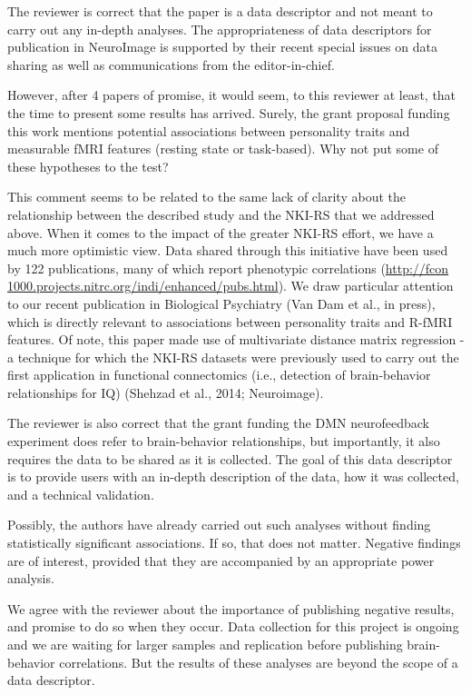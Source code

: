 \documentclass{article}
\newcommand{\RESPONSE}[1]{\textcolor{responseblue}{#1}}
\begin{document}
\RESPONSE{The reviewer is correct that the paper is a data descriptor and not meant to carry out any in-depth analyses. The appropriateness of data descriptors for publication in NeuroImage is supported by their recent special issues on data sharing as well as communications from the editor-in-chief.}

However, after 4 papers of promise, it would seem, to this reviewer at least, that the time to present some results has arrived. Surely, the grant proposal funding this work mentions potential associations between
personality traits and measurable fMRI features (resting state or task-based). Why not put some of these hypotheses to the test? 

\RESPONSE{This comment seems to be related to the same lack of clarity about the relationship between the described study and the NKI-RS that we addressed above. When it comes to the impact of the greater NKI-RS effort, we have a much more optimistic view. Data shared through this initiative have been used by 122 publications, many of which report phenotypic correlations (\url{http://fcon 1000.projects.nitrc.org/indi/enhanced/pubs.html}). We draw particular attention to our recent publication in Biological Psychiatry (Van Dam et al., in press), which is directly relevant to associations between personality traits and R-fMRI features. Of note, this paper made use of multivariate distance matrix regression - a technique for which the NKI-RS datasets were previously used to carry out the first application in functional connectomics (i.e., detection of brain-behavior relationships for IQ) (Shehzad et al., 2014; Neuroimage).}

\RESPONSE{The reviewer is also correct that the grant funding the DMN neurofeedback experiment does refer to brain-behavior relationships, but importantly, it also requires the data to be shared as it is collected. The goal of this data descriptor is to provide users with an in-depth description of the data, how it was collected, and a technical validation. }

Possibly, the authors have already carried out such analyses without finding statistically significant associations. If so, that does not matter. Negative findings are of interest, provided that they are accompanied by an appropriate power analysis. 

\RESPONSE{We agree with the reviewer about the importance of publishing negative results, and promise to do so when they occur. Data collection for this project is ongoing and we are waiting for larger samples and replication before publishing brain-behavior correlations. But the results of these analyses are beyond the scope of a data descriptor.}
\end{document}

